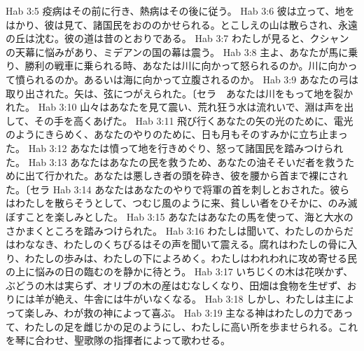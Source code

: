 Hab 3:5  疫病はその前に行き、熱病はその後に従う。
Hab 3:6  彼は立って、地をはかり、彼は見て、諸国民をおののかせられる。とこしえの山は散らされ、永遠の丘は沈む。彼の道は昔のとおりである。
Hab 3:7  わたしが見ると、クシャンの天幕に悩みがあり、ミデアンの国の幕は震う。
Hab 3:8  主よ、あなたが馬に乗り、勝利の戦車に乗られる時、あなたは川に向かって怒られるのか。川に向かって憤られるのか。あるいは海に向かって立腹されるのか。
Hab 3:9  あなたの弓は取り出された。矢は、弦につがえられた。〔セラ　あなたは川をもって地を裂かれた。
Hab 3:10  山々はあなたを見て震い、荒れ狂う水は流れいで、淵は声を出して、その手を高くあげた。
Hab 3:11  飛び行くあなたの矢の光のために、電光のようにきらめく、あなたのやりのために、日も月もそのすみかに立ち止まった。
Hab 3:12  あなたは憤って地を行きめぐり、怒って諸国民を踏みつけられた。
Hab 3:13  あなたはあなたの民を救うため、あなたの油そそいだ者を救うために出て行かれた。あなたは悪しき者の頭を砕き、彼を腰から首まで裸にされた。〔セラ
Hab 3:14  あなたはあなたのやりで将軍の首を刺しとおされた。彼らはわたしを散らそうとして、つむじ風のように来、貧しい者をひそかに、のみ滅ぼすことを楽しみとした。
Hab 3:15  あなたはあなたの馬を使って、海と大水のさかまくところを踏みつけられた。
Hab 3:16  わたしは聞いて、わたしのからだはわななき、わたしのくちびるはその声を聞いて震える。腐れはわたしの骨に入り、わたしの歩みは、わたしの下によろめく。わたしはわれわれに攻め寄せる民の上に悩みの日の臨むのを静かに待とう。
Hab 3:17  いちじくの木は花咲かず、ぶどうの木は実らず、オリブの木の産はむなしくなり、田畑は食物を生ぜず、おりには羊が絶え、牛舎には牛がいなくなる。
Hab 3:18  しかし、わたしは主によって楽しみ、わが救の神によって喜ぶ。
Hab 3:19  主なる神はわたしの力であって、わたしの足を雌じかの足のようにし、わたしに高い所を歩ませられる。これを琴に合わせ、聖歌隊の指揮者によって歌わせる。


